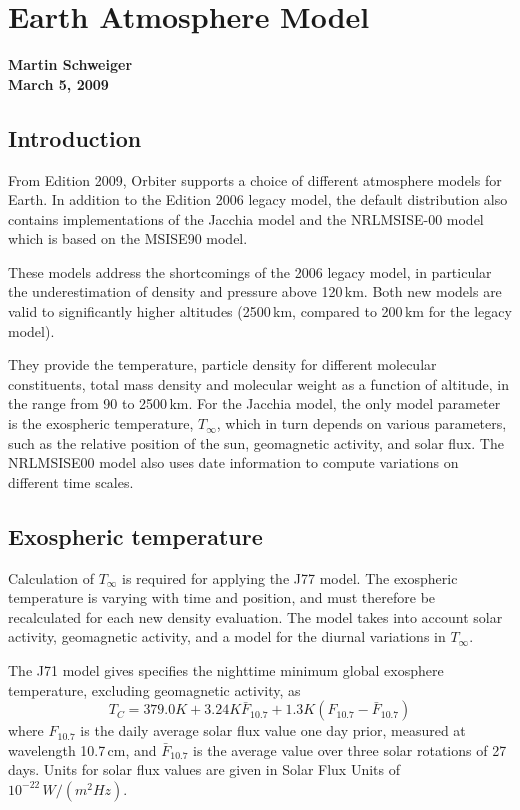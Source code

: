 \documentclass[Orbiter Technical Reference.tex]{subfiles}
\begin{document}
\section{Earth Atmosphere Model}
\textbf{Martin Schweiger}\\
\textbf{March 5, 2009}


\subsection{Introduction}
From Edition 2009, Orbiter supports a choice of different atmosphere models for Earth. In addition to the Edition 2006 legacy model, the default distribution also contains implementations of the Jacchia model \cite{jacchia65, jacchia71, jacchia77} and the NRLMSISE-00 model which is based on the MSISE90 model.

These models address the shortcomings of the 2006 legacy model, in particular the underestimation of density and pressure above 120\,km. Both new models are valid to significantly higher altitudes (2500\,km, compared to 200\,km for the legacy model).

They provide the temperature, particle density for different molecular constituents, total mass density and molecular weight as a function of altitude, in the range from 90 to 2500\,km. For the Jacchia model, the only model parameter is the exospheric temperature, $T_\infty$, which in turn depends on various parameters, such as the relative position of the sun, geomagnetic activity, and solar flux. The NRLMSISE00 model also uses date information to compute variations on different time scales.

\subsection{Exospheric temperature}
Calculation of $T_\infty$ is required for applying the J77 model. The exospheric temperature is varying with time and position, and must therefore be recalculated for each new density evaluation. The model takes into account solar activity, geomagnetic activity, and a model for the diurnal variations in $T_\infty$.

The J71 model gives specifies the nighttime minimum global exosphere temperature, excluding geomagnetic activity, as
\begin{equation}
T_C = 379.0K + 3.24K \bar{F}_{10.7} + 1.3K(F_{10.7}-\bar{F}_{10.7})
\end{equation}
where $F_{10.7}$ is the daily average solar flux value one day prior, measured at wavelength 10.7\,cm, and $\bar{F}_{10.7}$ is the average value over three solar rotations of 27 days. Units for solar flux values are given in Solar Flux Units of $10^{-22}\,W/(m^2 Hz)$.
\end{document}
